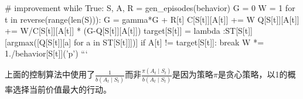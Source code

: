 \documentclass{ctexart}
\begin{document}
    # improvement
    while True:
        S, A, R = gen_episodes(behavior)
        G = 0
        W = 1
        for t in reverse(range(len(S))):
            G = gamma*G + R[t]
            C[S[t]][A[t]] += W
            Q[S[t]][A[t]] += W/C[S[t]][A[t]] * (G-Q[S[t]][A[t]])
            target[S[t]] = lambda :ST[S[t]][argmax([Q[S[t]][a] for a in ST[S[t]]])]
            if A[t] != target[S[t]]:
                break
            W *= 1./behavior[S[t]]('p')
```

上面的控制算法中使用了$\frac1{b(A_t\mid S_t)}$而非$\frac{\pi(A_t\mid S_t)}{b(A_t\mid S_t)}$是因为策略$\pi$是贪心策略，以1的概率选择当前价值最大的行动。
\end{document}
